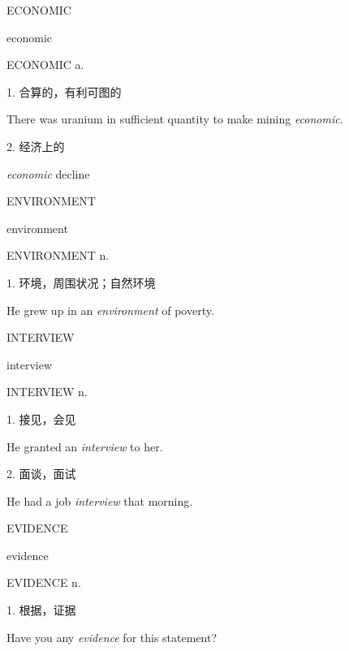 \begin{flashcard}{
ECONOMIC

economic
}
\begin{center}
ECONOMIC a. 
\end{center}
1. 合算的，有利可图的

There was uranium in sufficient quantity to make mining \textit{economic}.

2. 经济上的

\textit{economic} decline

\end{flashcard}
\begin{flashcard}{
ENVIRONMENT

environment
}
\begin{center}
ENVIRONMENT n. 
\end{center}
1. 环境，周围状况；自然环境

He grew up in an \textit{environment} of poverty.

\end{flashcard}
\begin{flashcard}{
INTERVIEW

interview
}
\begin{center}
INTERVIEW n. 
\end{center}
1. 接见，会见

He granted an \textit{interview} to her.

2. 面谈，面试

He had a job \textit{interview} that morning.

\end{flashcard}
\begin{flashcard}{
EVIDENCE

evidence
}
\begin{center}
EVIDENCE n. 
\end{center}
1. 根据，证据

Have you any \textit{evidence} for this statement?

\end{flashcard}
